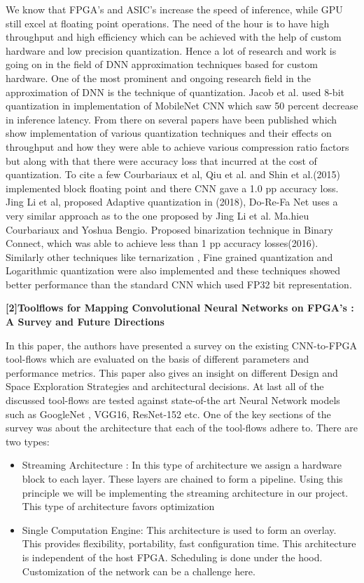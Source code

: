 \documentclass[titlepage]{report}
\begin{document}
We know that FPGA's and ASIC's increase the speed of inference, while GPU still excel at floating point operations. The need of the hour is to have high throughput and high efficiency which can be achieved with the help of custom hardware and low precision quantization. Hence a lot of research and work is going on in the field of DNN approximation techniques based for custom hardware. One of the most prominent and ongoing research field in the approximation of DNN is the technique of quantization. Jacob et al. used 8-bit quantization in implementation of MobileNet CNN which saw 50 percent
 decrease in inference latency. From there on several papers have been published which show implementation of various quantization techniques and their effects on throughput and how they were able to achieve various compression ratio factors but along with that there were accuracy loss that incurred at the cost of quantization. To cite a few Courbariaux et al, Qiu et al. and Shin et al.(2015) implemented block floating point and there CNN gave a 1.0 pp accuracy loss. Jing Li et al, proposed Adaptive quantization in (2018), Do-Re-Fa Net uses a very similar approach as to the one proposed by Jing Li et al. Ma.hieu Courbariaux and Yoshua Bengio.  Proposed binarization technique in Binary Connect, which was able to achieve less than 1 pp accuracy losses(2016). Similarly other techniques like ternarization , Fine grained quantization and Logarithmic quantization were also implemented and these techniques showed better performance than the standard CNN which used FP32 bit representation. 

\textbf{[2]Toolflows for Mapping Convolutional Neural Networks on FPGA's : A Survey and Future Directions}

In this paper, the authors have presented a survey on the existing CNN-to-FPGA tool-flows which are
evaluated on the basis of different parameters and performance metrics. This paper also gives an insight
on different Design and Space Exploration Strategies and architectural decisions. At last all of the
discussed tool-flows are tested against state-of-the art Neural Network models such as GoogleNet ,
VGG16, ResNet-152 etc.
One of the key sections of the survey was about the architecture that each of the tool-flows adhere to.
There are two types:
\begin{itemize}
\item Streaming Architecture : In this type of architecture we assign a hardware block to each layer. These
layers are chained to form a pipeline. Using this principle we will be implementing the streaming
architecture in our project. This type of architecture favors optimization
\item Single Computation Engine: This architecture is used to form an overlay. This provides flexibility,
portability, fast configuration time. This architecture is independent of the host FPGA. Scheduling is done
under the hood. Customization of the network can be a challenge here.
\end{itemize}
\end{document}
